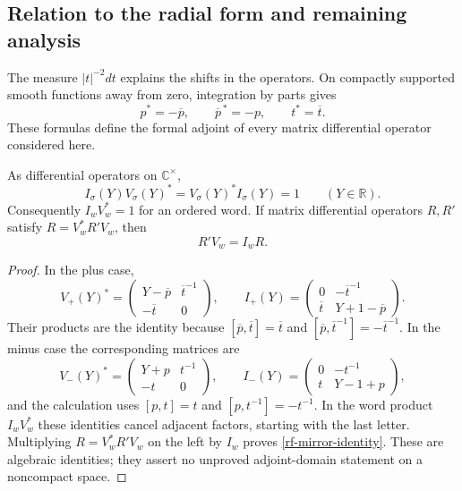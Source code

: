 \subsection{Relation to the radial form and remaining analysis}

The measure $|t|^{-2}dt$ explains the shifts in the
operators.  On compactly supported smooth functions
away from zero, integration by parts gives
\[
       p^*=-\overline p,\qquad
       \overline p^{\,*}=-p,\qquad t^*=\overline t.
\]
These formulas define the formal adjoint of every
matrix differential operator considered here.

\begin{lemma}\label{rf-inverse-adjoint}
As differential operators on $\mathbb C^\times$,
\[
             I_\sigma(Y)V_\sigma(Y)^*
             =V_\sigma(Y)^*I_\sigma(Y)=1
                      \qquad(Y\in\mathbb R).
\]
Consequently $I_wV_w^*=1$ for an ordered word.
If matrix differential operators $R,R'$ satisfy
$R=V_w^*R'V_w$, then
\begin{equation}\label{rf-mirror-identity}
                         R'V_w=I_wR.
\end{equation}
\end{lemma}

\begin{proof}
In the plus case,
\[
 V_+(Y)^*=
  \begin{pmatrix}Y-\overline p&\overline t^{-1}\\
                          -\overline t&0\end{pmatrix},
 \qquad
 I_+(Y)=
  \begin{pmatrix}0&-\overline t^{-1}\\
                  \overline t&Y+1-\overline p\end{pmatrix}.
\]
Their products are the identity because
$[\overline p,\overline t]=\overline t$ and
$[\overline p,\overline t^{-1}]=-\overline t^{-1}$.
In the minus case the corresponding matrices are
\[
 V_-(Y)^*=
  \begin{pmatrix}Y+p&t^{-1}\\-t&0\end{pmatrix},
 \qquad
 I_-(Y)=
  \begin{pmatrix}0&-t^{-1}\\t&Y-1+p\end{pmatrix},
\]
and the calculation uses $[p,t]=t$ and
$[p,t^{-1}]=-t^{-1}$.
In the word product $I_wV_w^*$ these identities cancel
adjacent factors, starting with the last letter.
Multiplying $R=V_w^*R'V_w$ on the left by $I_w$
proves \eqref{rf-mirror-identity}.
These are algebraic identities; they assert no
unproved adjoint-domain statement on a noncompact space.
\end{proof}

